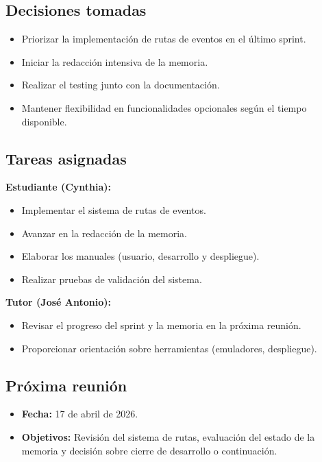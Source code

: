 \subsection*{Decisiones tomadas}
\begin{itemize}
    \item Priorizar la implementación de rutas de eventos en el último sprint.
    \item Iniciar la redacción intensiva de la memoria.
    \item Realizar el testing junto con la documentación.
    \item Mantener flexibilidad en funcionalidades opcionales según el tiempo disponible.
\end{itemize}

\subsection*{Tareas asignadas}

\textbf{Estudiante (Cynthia):}
\begin{itemize}
    \item Implementar el sistema de rutas de eventos.
    \item Avanzar en la redacción de la memoria.
    \item Elaborar los manuales (usuario, desarrollo y despliegue).
    \item Realizar pruebas de validación del sistema.
\end{itemize}

\textbf{Tutor (José Antonio):}
\begin{itemize}
    \item Revisar el progreso del sprint y la memoria en la próxima reunión.
    \item Proporcionar orientación sobre herramientas (emuladores, despliegue).
\end{itemize}

\subsection*{Próxima reunión}
\begin{itemize}
    \item \textbf{Fecha:} 17 de abril de 2026.
    \item \textbf{Objetivos:} Revisión del sistema de rutas, evaluación del estado de la memoria y decisión sobre cierre de desarrollo o continuación.
\end{itemize}

